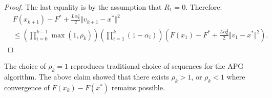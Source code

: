 \documentclass[12pt]{article}
\begin{document}
\begin{proof}
        The last equality is by the assumption that $R_1 = 0$. 
        Therefore: 
        {\small
        \begin{align*}
            & 
            F(x_{k + 1}) - F^* +
            \frac{L\alpha_k^2}{2}\Vert v_{k + 1} - x^*\Vert^2
            \\
            &\le 
            \left(
                \prod_{i = 0}^{k - 1} \max(1, \rho_{k})
            \right)
            \left(
                \prod_{i = 1}^{k} \left(1  - \alpha_i\right)
            \right)
            \left(
                F(x_1) - F^* + \frac{L\alpha_0^2}{2}\Vert v_1 - x^*\Vert^2
            \right). 
        \end{align*}
        }
    \end{proof}
    \begin{remark}        
        The choice of $\rho_k = 1$ reproduces traditional choice of sequences for the APG algorithm. 
        The above claim showed that there exists $\rho_k > 1$, or $\rho_k < 1$ where convergence of $F(x_k) - F(x^*)$ remains possible. 
    \end{remark}
\end{document}
